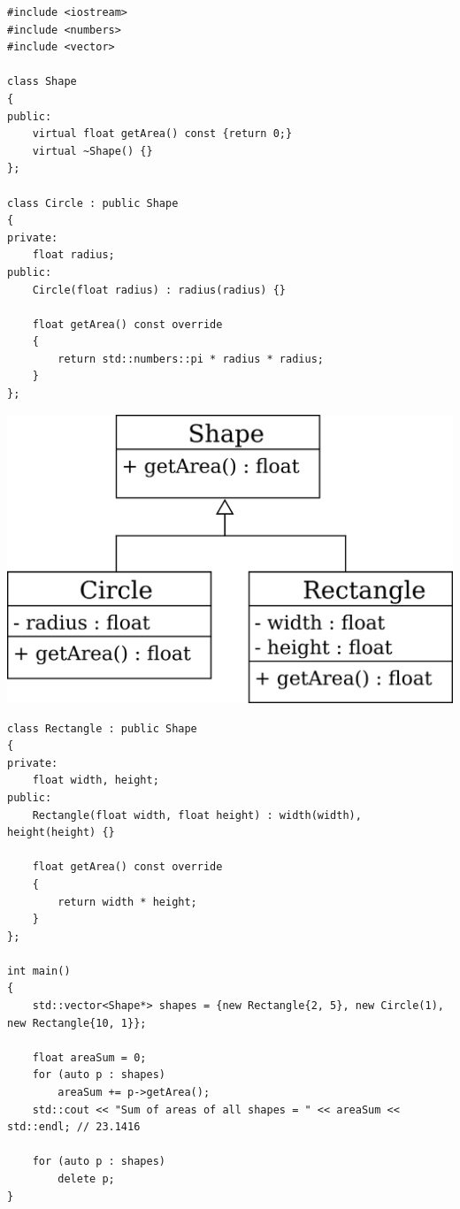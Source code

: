 \documentclass{article}
\begin{document}
\noindent
\begin{minipage}{0.55\textwidth}
\begin{lstlisting}[style=csMiptCppStyle]
#include <iostream>
#include <numbers>
#include <vector>

class Shape
{
public:
    virtual float getArea() const {return 0;}
    virtual ~Shape() {}
};

class Circle : public Shape
{
private:
    float radius;
public:
    Circle(float radius) : radius(radius) {}
    
    float getArea() const override
    {
        return std::numbers::pi * radius * radius;
    }
};
\end{lstlisting}
\end{minipage}
\begin{minipage}{0.45\textwidth}
\begin{center}
\includegraphics[scale=0.8]{../images/shapes.png}
\end{center}
\end{minipage}

\noindent
\begin{lstlisting}[style=csMiptCppStyle]
class Rectangle : public Shape
{
private:
    float width, height;
public:
    Rectangle(float width, float height) : width(width), height(height) {}
    
    float getArea() const override
    {
        return width * height;
    }
};

int main()
{
    std::vector<Shape*> shapes = {new Rectangle{2, 5}, new Circle(1), new Rectangle{10, 1}};
    
    float areaSum = 0;
    for (auto p : shapes)
        areaSum += p->getArea();
    std::cout << "Sum of areas of all shapes = " << areaSum << std::endl; // 23.1416
    
    for (auto p : shapes)
        delete p;
}
\end{lstlisting}
\end{document}
